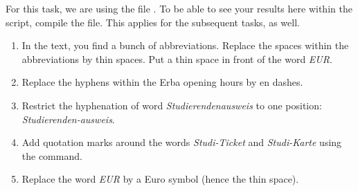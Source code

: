 For this task, we are using the file .
To be able to see your results here within the script,
compile the  file.
This applies for the subsequent tasks, as well.

\begin{enumerate}
	\item In the text, you find a bunch of abbreviations. Replace the spaces within the abbreviations by thin spaces. Put a thin space in front of the word \emph{EUR}.
	\item Replace the hyphens within the Erba opening hours by en dashes.
	\item Restrict the hyphenation of word \emph{Studierendenausweis} to one position: \\\emph{Studierenden-ausweis}.
	\item Add quotation marks around the words \emph{Studi-Ticket} and 
	\emph{Studi-Karte} using the  command.
	\item Replace the word \emph{EUR} by a Euro symbol (hence the thin space). 
\end{enumerate}


